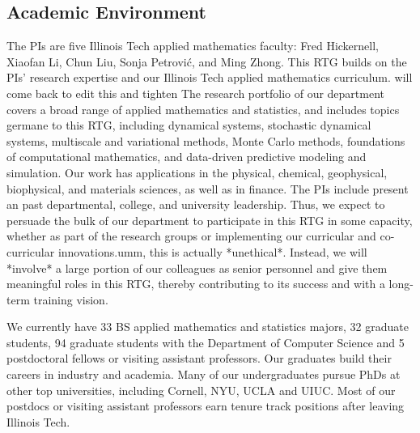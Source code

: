 \documentclass[11pt]{NSFamsart}
\newcommand{\numUG}{33\xspace}
\newcommand{\numPhD}{32\xspace}
\newcommand{\numPostDoc}{5\xspace}
\newcommand{\numjoint}{94\xspace}
\begin{document}
\subsection*{Academic Environment} The PIs are five Illinois Tech applied mathematics faculty:  %
Fred Hickernell, Xiaofan Li, Chun Liu, Sonja Petrovi\'c, and Ming Zhong. This RTG builds on the PIs' research expertise and our Illinois Tech applied mathematics curriculum. {\color{magenta}will come back to edit this and tighten}  The research portfolio of our department covers a broad range of applied mathematics and statistics, and includes topics germane to this RTG, including dynamical systems, stochastic dynamical systems, multiscale and variational methods,  Monte Carlo methods, foundations of computational mathematics, and data-driven predictive modeling and simulation. Our work has applications in the physical, chemical, geophysical, biophysical, and materials sciences, as well as in finance. The PIs include present an past departmental, college, and university leadership.   Thus, we expect to persuade the bulk of our department to participate in this RTG in some capacity, whether as part of the research groups or implementing our curricular and co-curricular innovations.{\color{magenta}umm, this is actually *unethical*. Instead, we will *involve* a large portion of our colleagues as senior personnel and give them meaningful roles in this RTG, thereby contributing to its success and with a long-term training vision.}

 We currently have \numUG BS applied mathematics and statistics majors, \numPhD graduate students, \numjoint graduate students with the Department of Computer Science and   \numPostDoc postdoctoral fellows or visiting assistant professors. Our graduates build their careers in  industry  and academia. Many of our undergraduates pursue PhDs at other top universities, including Cornell, NYU, UCLA and UIUC. Most of our postdocs or visiting assistant professors earn tenure track positions after leaving Illinois Tech.
\end{document}
